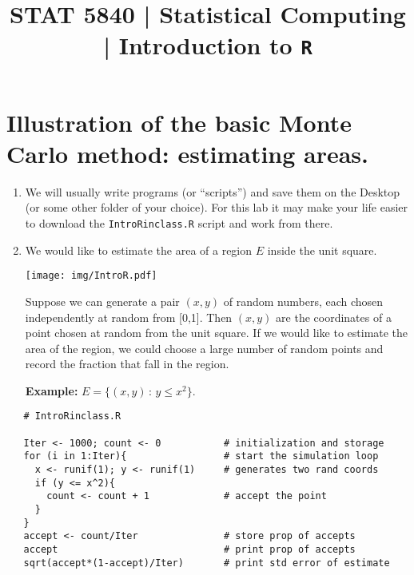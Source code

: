 \documentclass[10pt,english]{article}
\title{STAT 5840 | Statistical Computing | Introduction to \texttt{R}}
\date{}
\begin{document}
\maketitle

\thispagestyle{empty}

\section*{Illustration of the basic Monte Carlo method: \textbf{estimating areas}.}
\label{sec-1}



\begin{enumerate}
\item We will usually write programs (or ``scripts'') and save them on the Desktop (or some other folder of your choice).  For this lab it may make your life easier to download the \texttt{IntroRinclass.R} script and work from there.
\item We would like to estimate the area of a region $E$ inside the unit square.

   \begin{center}


   \texttt{[image: img/IntroR.pdf]}

   \end{center}

   Suppose we can generate a pair \( (x,y) \) of random numbers, each chosen independently at random from [0,1].  Then \( (x,y) \) are the coordinates of a point chosen at random from the unit square.  If we would like to estimate the area of the region, we could choose a large number of random points and record the fraction that fall in the region.

   \textbf{Example:} $E = \{ (x,y)\, : \, y \leq x^2  \}$.
\end{enumerate}


\begin{verbatim}
   # IntroRinclass.R

   Iter <- 1000; count <- 0           # initialization and storage
   for (i in 1:Iter){                 # start the simulation loop       
     x <- runif(1); y <- runif(1)     # generates two rand coords
     if (y <= x^2){ 
       count <- count + 1             # accept the point
     }
   }
   accept <- count/Iter               # store prop of accepts
   accept                             # print prop of accepts
   sqrt(accept*(1-accept)/Iter)       # print std error of estimate
\end{verbatim}
\end{document}
